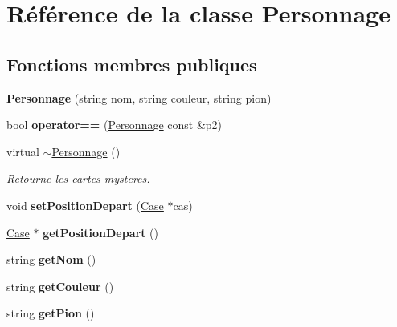\hypertarget{classPersonnage}{\section{\-Référence de la classe \-Personnage}
\label{classPersonnage}
}
\subsection*{\-Fonctions membres publiques}
\begin{DoxyCompactItemize}
\item 
\hypertarget{classPersonnage_a2a1535b694f3f69e07b646462d64db4d}{{\bfseries \-Personnage} (string nom, string couleur, string pion)}\label{classPersonnage_a2a1535b694f3f69e07b646462d64db4d}

\item 
\hypertarget{classPersonnage_a40dce2ec7abb60ec4b069c614e85c813}{bool {\bfseries operator==} (\hyperlink{classPersonnage}{\-Personnage} const \&p2)}\label{classPersonnage_a40dce2ec7abb60ec4b069c614e85c813}

\item 
virtual \hyperlink{classPersonnage_a05bdf2a469885bb1fbb6c2e8f98972ab}{$\sim$\-Personnage} ()
\begin{DoxyCompactList}\small\item\em \-Retourne les cartes mysteres. \end{DoxyCompactList}\item 
\hypertarget{classPersonnage_a09a6d250d12b7cde72cef60d6153977d}{void {\bfseries set\-Position\-Depart} (\hyperlink{classCase}{\-Case} $\ast$cas)}\label{classPersonnage_a09a6d250d12b7cde72cef60d6153977d}

\item 
\hypertarget{classPersonnage_a94665cc5f3d0e5d3b30e1039d7970f8c}{\hyperlink{classCase}{\-Case} $\ast$ {\bfseries get\-Position\-Depart} ()}\label{classPersonnage_a94665cc5f3d0e5d3b30e1039d7970f8c}

\item 
\hypertarget{classPersonnage_a519301399a9bee1557858aa50a04a85a}{string {\bfseries get\-Nom} ()}\label{classPersonnage_a519301399a9bee1557858aa50a04a85a}

\item 
\hypertarget{classPersonnage_aebbd390a61c946de43685c810d579c42}{string {\bfseries get\-Couleur} ()}\label{classPersonnage_aebbd390a61c946de43685c810d579c42}

\item 
\hypertarget{classPersonnage_a56fdaf04ef2cebf901c01b284f81f67b}{string {\bfseries get\-Pion} ()}\label{classPersonnage_a56fdaf04ef2cebf901c01b284f81f67b}

\end{DoxyCompactItemize}


